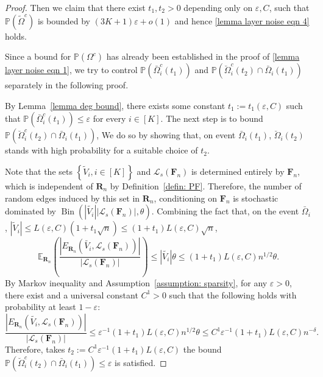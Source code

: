 \documentclass[twoside,11pt]{article}
\theoremstyle{remark}
\begin{document}
\begin{proof}
Then we claim that there exist $t_1, t_2>0$ depending only on $\varepsilon, C$, such that
$\mathbb{P}\left(\tilde{\Omega}^c\right)$ is bounded by $\left(3K+1\right)\varepsilon+o(1)$ and hence \eqref{lemma layer noise eqn 4} holds.

Since a bound for $\mathbb{P}\left(\Omega^c\right)$ has already been established in the proof of \eqref{lemma layer noise eqn 1}, we try to control $\mathbb{P}\left(\bar{\Omega}_i^c\left(t_1\right)\right)$ and $\mathbb{P}\left(\breve{\Omega}_i^c\left(t_2\right) \cap \bar{\Omega}_i\left(t_1\right)\right)$ separately in the following proof.

By Lemma~\ref{lemma deg bound}, there exists some constant $t_1:=t_1\left(\varepsilon, C\right)$ such that $\mathbb{P}\left(\bar{\Omega}^c_i\left(t_1\right)\right)\le \varepsilon$ for every $i \in [K]$.
The next step is to bound $\mathbb{P}\left(\breve{\Omega}^c_i\left(t_2\right)\cap \bar{\Omega}_i\left(t_1\right)\right)$, We do so by showing that, on event $\bar{\Omega}_i(t_1)$, $\breve{\Omega}_i(t_2)$ stands with high probability for a suitable choice of $t_2$.

Note that the sets $\left\{\tilde{V}_i, i \in \left[K\right]\right\}$ and $\mathcal{L}_s\left(\boldsymbol{F}_n\right)$
is determined entirely by $\bm{F}_n$, which is independent of $\boldsymbol{R}_n$ by Definition~\ref{defin: PF}. Therefore, the number of random edges induced by this set in $\boldsymbol{R}_n$, conditioning on $\boldsymbol{F}_n$ is stochastic dominated by $\operatorname{Bin} \left(\left|\tilde{V_i}\right| \left|\mathcal{L}_s\left(\boldsymbol{F}_n\right)\right|, \theta \right)$.
Combining the fact that, on the event $\bar{\Omega}_i$, $\left|\tilde{V}_i\right|\le L(\varepsilon,C)(1+t_1\sqrt n)\le(1+t_1)L(\varepsilon,C)\sqrt n$, 
%
\begin{equation*}    \mathbb{E}_{\bm{R}_n}\left(\frac{\left|E_{\boldsymbol{R}_n}\left(\tilde{V_i}, \mathcal{L}_s\left(\boldsymbol{F}_n\right)\right)\right|}{\left|\mathcal{L}_s\left(\boldsymbol{F}_n\right)\right|} \right)
\le \left|\tilde{V_i}\right| \theta
\le (1+t_1) L\left(\varepsilon, C\right)n^{1/2}\theta.
\end{equation*}
%
By Markov inequality and Assumption~\ref{assumption: sparsity}, for any $\varepsilon>0$, there exist and a universal constant $C^1>0$ such that the following holds with probability at least $1-\varepsilon$:
%
\begin{equation*}   \frac{\left|E_{\boldsymbol{R}_n}\left(\tilde{V_i}, \mathcal{L}_s\left(\boldsymbol{F}_n\right)\right)\right|}{\left| \mathcal{L}_s\left(\boldsymbol{F}_n\right)\right|}\le \varepsilon^{-1} (1+t_1) L\left(\varepsilon, C\right)n^{1/2}\theta\le  C^1\varepsilon^{-1} (1+t_1) L\left(\varepsilon, C\right)n^{-\delta}. 
\end{equation*}
%
Therefore, takes $t_2:=C^1\varepsilon^{-1} (1+t_1)L\left(\varepsilon, C\right)$ the bound $\mathbb{P}\left(\breve{\Omega}^c_i\left(t_2\right)\cap \bar{\Omega}_i\left(t_1\right)\right)\le \varepsilon$ is satisfied.




\end{proof}
\end{document}
